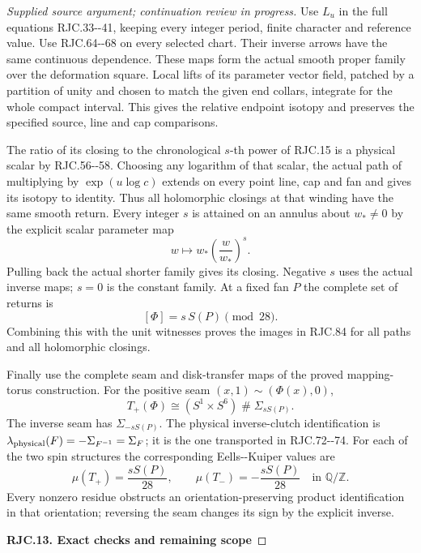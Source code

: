 \begin{proof}[Supplied source argument; continuation review in progress]
Use \(L_u\) in the full equations
RJC.33-\/-41, keeping every integer
period, finite character and reference
value. Use RJC.64-\/-68 on every selected
chart. Their inverse arrows have the
same continuous dependence. These
maps form the actual smooth proper
family over the deformation square.
Local lifts of its parameter vector
field, patched by a partition of
unity and chosen to match the given
end collars, integrate for the
whole compact interval. This gives
the relative endpoint isotopy and
preserves the specified source,
line and cap comparisons.

The ratio of its closing to the
chronological \(s\)-th power of
RJC.15 is a physical scalar by
RJC.56-\/-58. Choosing any logarithm
of that scalar, the actual path
of multiplying by \(\exp(u\log c)\)
extends on every point line,
cap and fan and gives its isotopy
to identity. Thus all holomorphic
closings at that winding have
the same smooth return.
Every integer \(s\) is attained
on an annulus about \(w_*\ne0\)
by the explicit scalar parameter
map
\[
 w\longmapsto
 w_*\left(\frac{w}{w_*}\right)^s.
 \tag{RJC.86}
\]
Pulling back the actual shorter
family gives its closing. Negative
\(s\) uses the actual inverse
maps; \(s=0\) is the constant
family. At a fixed fan \(P\) the
complete set of returns is
\[
 [\Phi]=s\,S(P)\pmod{28}.
 \tag{RJC.87}
\]
Combining this with the unit
witnesses proves the images
in RJC.84 for all paths and
all holomorphic closings.

Finally use the complete seam
and disk-transfer maps of the
proved mapping-torus construction.
For the positive seam
\((x,1)\sim(\Phi(x),0)\),
\[
 T_+(\Phi)\cong
 (S^1\times S^6)\mathbin{\#}\Sigma_{sS(P)}.
 \tag{RJC.88}
\]
The inverse seam has
\(\Sigma_{-sS(P)}\).
The physical inverse-clutch
identification is
\(\lambda_{\rm physical}(F)
=-\Sigma_{F^{-1}}=\Sigma_F\);
it is the one transported in
RJC.72-\/-74.
For each of the two spin
structures the corresponding
Eells-\/-Kuiper values are
\[
 \mu(T_+)=\frac{sS(P)}{28},
 \qquad
 \mu(T_-)=-\frac{sS(P)}{28}
 \quad\text{in }\mathbb Q/\mathbb Z.
 \tag{RJC.89}
\]
Every nonzero residue obstructs
an orientation-preserving product
identification in that orientation;
reversing the seam changes its
sign by the explicit inverse.

\par

\medskip\noindent\textbf{RJC.13. Exact checks and remaining scope}

\par\nobreak


\end{proof}
